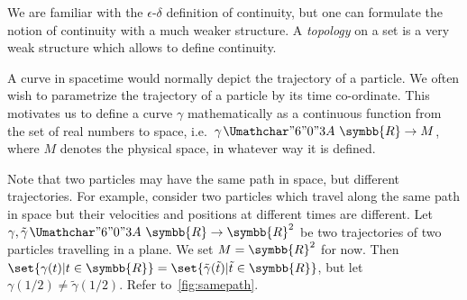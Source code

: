 \documentclass[a4paper, 11pt]{book}
\theoremstyle{definition}
\newcommand{\rr}{\symbb{R}}
\newcommand{\rtwo}{\rr^2}
\renewcommand{\colon}{\nobreak\mskip2mu\mathpunct{}\nonscript
  \mkern-\thinmuskip{\Umathchar"6 "0 "3A}\mskip6muplus1mu\relax}
\begin{document}
    We are familiar with the \(\epsilon\)\nobreakdash-\(\delta\) definition of continuity, but one can formulate the notion of continuity with a much weaker structure. A \textit{topology} on a set is a very weak structure which allows to define continuity.

    A curve in spacetime would normally depict the trajectory of a particle. We often wish to parametrize the trajectory of a particle by its time co-ordinate. This motivates us to define a curve \(\gamma\) mathematically as a continuous function from the set of real numbers to space, i.e.\ \(\gamma \colon \rr \rightarrow M\), where \(M\) denotes the physical space, in whatever way it is defined.

    Note that two particles may have the same path in space, but different trajectories. For example, consider two particles which travel along the same path in space but their velocities and positions at different times are different. Let \(\gamma, \tilde\gamma \colon \rr \rightarrow \rtwo\) be two trajectories of two particles travelling in a plane. We set \(M = \rtwo\) for now. Then \(\set{\gamma(t) | t \in \rr} = \set{\tilde\gamma(\tilde t) | \tilde t \in \rr}\), but let \(\gamma(1/2) \neq \tilde\gamma(1/2)\). Refer to~\cref{fig:samepath}.
\end{document}
